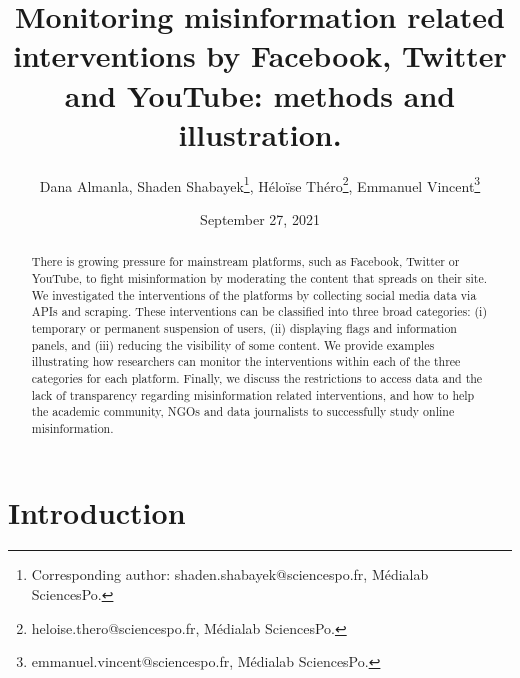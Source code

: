 \documentclass{article}
\begin{document}
\title{Monitoring misinformation related interventions by Facebook, Twitter and YouTube: methods and illustration.}
\author{Dana Almanla, Shaden Shabayek\footnote{Corresponding author: shaden.shabayek@sciencespo.fr, M\'{e}dialab SciencesPo.}, H\'{e}lo\"{i}se Th\'{e}ro\footnote{heloise.thero@sciencespo.fr, M\'{e}dialab SciencesPo.}, Emmanuel Vincent\footnote{emmanuel.vincent@sciencespo.fr, M\'{e}dialab SciencesPo.}}
\date{September 27, 2021}
\maketitle







\begin{abstract}

There is growing pressure for mainstream platforms, such as Facebook, Twitter or YouTube, to fight misinformation by moderating the content that spreads on their site. We investigated the interventions of the platforms by collecting social media data via APIs and scraping. These interventions can be classified into three broad categories: (i) temporary or permanent suspension of users, (ii) displaying flags and information panels, and (iii) reducing the visibility of some content. We provide examples illustrating how researchers can monitor the interventions within each of the three categories for each platform. Finally, we discuss the restrictions to access data and the lack of transparency regarding misinformation related interventions, and how to help the academic community, NGOs and data journalists to successfully study online misinformation. 
\end{abstract}

\section{Introduction}
\end{document}
